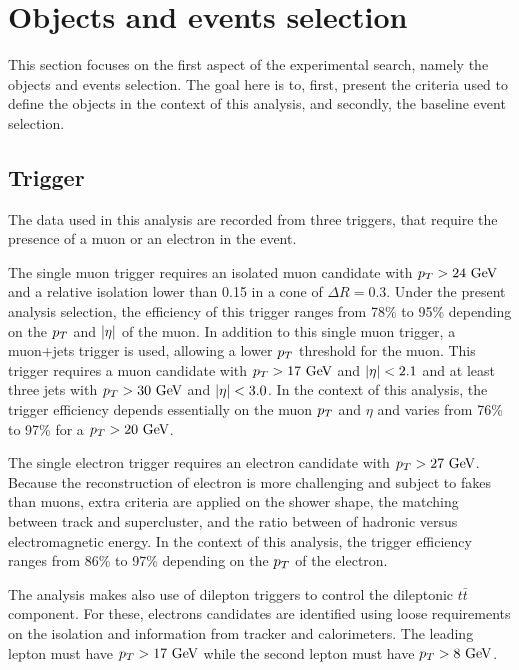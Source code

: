     \section{Objects and events selection \label{sec:analysis_objectAndEventSelection}}

    This section focuses on the first aspect of the experimental search, namely
    the objects and events selection. The goal here is to, first, present the
    criteria used to define the objects in the context of this analysis, and
    secondly, the baseline event selection.

        \subsection{Trigger}

    The data used in this analysis are recorded from three triggers, that
    require the presence of a muon or an electron in the event.

    The single muon trigger requires an isolated muon candidate with $p_T >
    24~\text{GeV}$ and a relative isolation lower than 0.15 in a cone of $\Delta R =
    0.3$. Under the present analysis selection, the efficiency of this trigger
    ranges from 78\% to 95\% depending on the $p_T$ and $\left| \eta \right|$ of the muon.
    In addition to this single muon trigger, a muon+jets trigger is used,
    allowing a lower $p_T$ threshold for the muon. This trigger requires a muon
    candidate with $p_T > 17~\text{GeV}$ and $\left| \eta \right| < 2.1$ and at least three jets
    with $p_T > 30~\text{GeV}$ and $\left| \eta \right| < 3.0$. In the context of this analysis,
    the trigger efficiency depends essentially on the muon $p_T$ and $\eta$ and
    varies from 76\% to 97\% for a $p_T > 20~\text{GeV}$.

    The single electron trigger requires an electron candidate with $p_T >
    27~\text{GeV}$. Because the reconstruction of electron is more challenging and
    subject to fakes than muons, extra criteria are applied on the shower shape,
    the matching between track and supercluster, and the ratio between of
    hadronic versus electromagnetic energy. In the context of this analysis, the
    trigger efficiency ranges from 86\% to 97\% depending on the $p_T$ of the
    electron.

    The analysis makes also use of dilepton triggers to control the dileptonic
    $t\bar{t}$ component. For these, electrons candidates are identified using
    loose requirements on the isolation and information from tracker and
    calorimeters. The leading lepton must have $p_T > 17~\text{GeV}$ while the second
    lepton must have $p_T > 8~\text{GeV}$.

